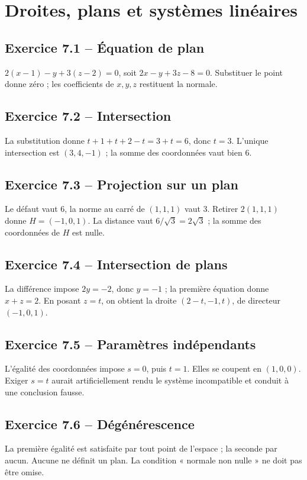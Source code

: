 \chapter{Droites, plans et systèmes linéaires}
\section*{Exercice 7.1 -- Équation de plan}
$2(x-1)-y+3(z-2)=0$, soit $2x-y+3z-8=0$. Substituer le point donne zéro ; les coefficients de $x,y,z$ restituent la normale.

\section*{Exercice 7.2 -- Intersection}
La substitution donne $t+1+t+2-t=3+t=6$, donc $t=3$. L'unique intersection est $(3,4,-1)$ ; la somme des coordonnées vaut bien $6$.

\section*{Exercice 7.3 -- Projection sur un plan}
Le défaut vaut $6$, la norme au carré de $(1,1,1)$ vaut $3$. Retirer $2(1,1,1)$ donne $H=(-1,0,1)$. La distance vaut $6/\sqrt3=2\sqrt3$ ; la somme des coordonnées de $H$ est nulle.

\section*{Exercice 7.4 -- Intersection de plans}
La différence impose $2y=-2$, donc $y=-1$ ; la première équation donne $x+z=2$. En posant $z=t$, on obtient la droite $(2-t,-1,t)$, de directeur $(-1,0,1)$.

\section*{Exercice 7.5 -- Paramètres indépendants}
L'égalité des coordonnées impose $s=0$, puis $t=1$. Elles se coupent en $(1,0,0)$. Exiger $s=t$ aurait artificiellement rendu le système incompatible et conduit à une conclusion fausse.

\section*{Exercice 7.6 -- Dégénérescence}
La première égalité est satisfaite par tout point de l'espace ; la seconde par aucun. Aucune ne définit un plan. La condition « normale non nulle » ne doit pas être omise.
